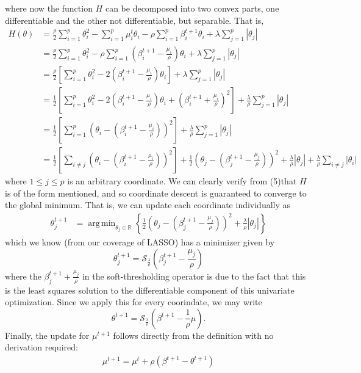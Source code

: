 \documentclass[10pt]{article}
\newcommand{\bp}[1]{\left({#1}\right)}
\newcommand{\mbb}[1]{\mathbb{#1}}
\newcommand{\1}[1]{\mathbbm{1}_{#1}}
\DeclareMathOperator{\argmin}{arg\,min}
\begin{document}
where now the function $H$ can be decomposed into two convex parts, one differentiable and the other not differentiable, but separable. That is,
\begin{align*}
    H(\theta)&=\frac{\rho}{2}\sum_{i=1}^p\theta_i^2-\sum_{i=1}^p\mu_i^t\theta_i-\rho\sum_{i=1}^p\beta^{t+1}_i\theta_i+\lambda\sum_{j=1}^p|\theta_j|\\
    &=\frac{\rho}{2}\sum_{i=1}^p\theta_i^2-\rho\sum_{i=1}^p\left(\beta_i^{t+1}-\frac{\mu_i}{\rho}\right)\theta_i+\lambda\sum_{j=1}^p|\theta_j|\\
    &=\frac{\rho}{2}\left[\sum_{i=1}^p\theta_i^2-2\bp{\beta_i^{t+1}-\frac{\mu_i}{\rho}}\theta_i\right]+\lambda\sum_{j=1}^p|\theta_j|\\
    &=\frac{1}{2}\left[\sum_{i=1}^p\theta_i^2-2\bp{\beta_i^{t+1}-\frac{\mu_i}{\rho}}\theta_i+\bp{\beta^{t+1}_i+\frac{\mu_i}{\rho}}^2\right]+\frac{\lambda}{\rho}\sum_{j=1}^p|\theta_j|\\
    &=\frac{1}{2}\left[\sum_{i=1}^p\bp{\theta_i-\bp{\beta_i^{t+1}-\frac{\mu_i}{\rho}}}^2\right]+\frac{\lambda}{\rho}\sum_{j=1}^p|\theta_j|\tag{5}\\
    &=\frac{1}{2}\left[\sum_{i\neq j}\bp{\theta_i-\bp{\beta_i^{t+1}-\frac{\mu_i}{\rho}}}^2\right]+\frac{1}{2}\bp{\theta_j-\bp{\beta_j^{t+1}-\frac{\mu_j}{\rho}}}^2+\frac{\lambda}{\rho}|\theta_j|+\frac{\lambda}{\rho}\sum_{i\neq j}|\theta_i|
\end{align*}
where $1\leq j\leq p$ is an arbitrary coordinate. We can clearly verify from (5)that $H$ is of the form mentioned, and so coordinate descent is guaranteed to converge to the global minimum. That is, we can update each coordinate individually as
\begin{align*}
    \theta^{t+1}_j&=\argmin_{\theta_j\in\mbb{R}}\left\{\frac{1}{2}\bp{\theta_j-\bp{\beta_j^{t+1}-\frac{\mu_j}{\rho}}}^2+\frac{\lambda}{\rho}|\theta_j|\right\}
\end{align*}
which we know (from our coverage of LASSO) has a minimizer given by
\[\theta^{t+1}_j=\mathcal{S}_{\frac{\lambda}{\rho}}\bp{\beta_j^{t+1}-\frac{\mu_j}{\rho}}\]
where the $\beta^{t+1}_j+\tfrac{\mu_j}{\rho}$ in the soft-thresholding operator is due to the fact that this is the least squares solution to the differentiable component of this univariate optimization. Since we apply this for every coorindate, we may write
\[\theta^{t+1}=\mathcal{S}_{\frac{\lambda}{\rho}}\bp{\beta^{t+1}-\frac{1}{\rho}\mu}.\]
Finally, the update for $\mu^{t+1}$ follows directly from the definition with no derivation required:
\begin{align*}
    \mu^{t+1}=\mu^t+\rho(\beta^{t+1}-\theta^{t+1})
\end{align*}
\end{document}
